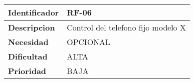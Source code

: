\begin{center}
    \begin{tabular}{|p{2.6cm}|p{12cm}|}
    \hline
    \textbf{Identificador} & RF-06\\
    \hline
    \textbf{Descripcion} & Control del telefono fijo modelo X\\
    \hline
    \textbf{Necesidad} & OPCIONAL\\
    \hline
    \textbf{Dificultad} & ALTA\\
    \hline
    \textbf{Prioridad} & BAJA\\
    \hline
    \end{tabular}
\end{center}
